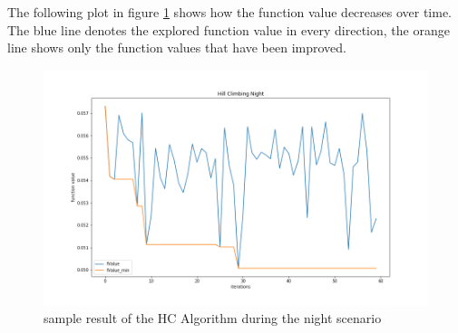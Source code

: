 \documentclass[./\jobname.tex]{subfiles}
\begin{document}
\begin{table}[H]
	\centering
	\noindent{}
	\label{tab:exp_hc_night}
\end{table}

\newpage

The following plot in figure \ref{fig:exp_hc_night_result} shows how the function value decreases over time. The blue line denotes the explored function value in every direction, the orange line shows only the function values that have been improved. 

\begin{figure}[H]
	\centering
	\includegraphics[width=\textwidth]{../img/png/hc_night.png}
	\caption{sample result of the HC Algorithm during the night scenario}
	\label{fig:exp_hc_night_result}
\end{figure}
\end{document}
